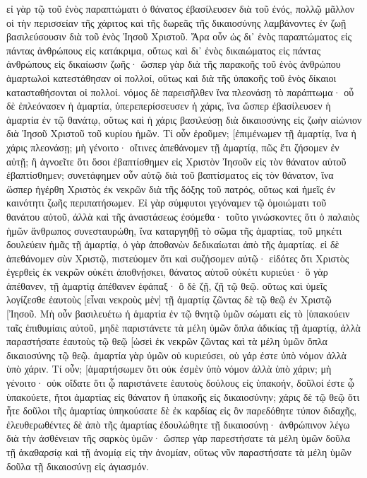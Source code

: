εἰ γὰρ τῷ τοῦ ἑνὸς παραπτώματι ὁ θάνατος ἐβασίλευσεν διὰ τοῦ ἑνός, πολλῷ μᾶλλον οἱ τὴν περισσείαν τῆς χάριτος καὶ τῆς δωρεᾶς τῆς δικαιοσύνης λαμβάνοντες ἐν ζωῇ βασιλεύσουσιν διὰ τοῦ ἑνὸς Ἰησοῦ Χριστοῦ. 
Ἄρα οὖν ὡς δι᾽ ἑνὸς παραπτώματος εἰς πάντας ἀνθρώπους εἰς κατάκριμα, οὕτως καὶ δι᾽ ἑνὸς δικαιώματος εἰς πάντας ἀνθρώπους εἰς δικαίωσιν ζωῆς· 
ὥσπερ γὰρ διὰ τῆς παρακοῆς τοῦ ἑνὸς ἀνθρώπου ἁμαρτωλοὶ κατεστάθησαν οἱ πολλοί, οὕτως καὶ διὰ τῆς ὑπακοῆς τοῦ ἑνὸς δίκαιοι κατασταθήσονται οἱ πολλοί. 
νόμος δὲ παρεισῆλθεν ἵνα πλεονάσῃ τὸ παράπτωμα· οὗ δὲ ἐπλεόνασεν ἡ ἁμαρτία, ὑπερεπερίσσευσεν ἡ χάρις, 
ἵνα ὥσπερ ἐβασίλευσεν ἡ ἁμαρτία ἐν τῷ θανάτῳ, οὕτως καὶ ἡ χάρις βασιλεύσῃ διὰ δικαιοσύνης εἰς ζωὴν αἰώνιον διὰ Ἰησοῦ Χριστοῦ τοῦ κυρίου ἡμῶν. 
Τί οὖν ἐροῦμεν; [ἐπιμένωμεν τῇ ἁμαρτίᾳ, ἵνα ἡ χάρις πλεονάσῃ; 
μὴ γένοιτο· οἵτινες ἀπεθάνομεν τῇ ἁμαρτίᾳ, πῶς ἔτι ζήσομεν ἐν αὐτῇ; 
ἢ ἀγνοεῖτε ὅτι ὅσοι ἐβαπτίσθημεν εἰς Χριστὸν Ἰησοῦν εἰς τὸν θάνατον αὐτοῦ ἐβαπτίσθημεν; 
συνετάφημεν οὖν αὐτῷ διὰ τοῦ βαπτίσματος εἰς τὸν θάνατον, ἵνα ὥσπερ ἠγέρθη Χριστὸς ἐκ νεκρῶν διὰ τῆς δόξης τοῦ πατρός, οὕτως καὶ ἡμεῖς ἐν καινότητι ζωῆς περιπατήσωμεν. 
Εἰ γὰρ σύμφυτοι γεγόναμεν τῷ ὁμοιώματι τοῦ θανάτου αὐτοῦ, ἀλλὰ καὶ τῆς ἀναστάσεως ἐσόμεθα· 
τοῦτο γινώσκοντες ὅτι ὁ παλαιὸς ἡμῶν ἄνθρωπος συνεσταυρώθη, ἵνα καταργηθῇ τὸ σῶμα τῆς ἁμαρτίας, τοῦ μηκέτι δουλεύειν ἡμᾶς τῇ ἁμαρτίᾳ, 
ὁ γὰρ ἀποθανὼν δεδικαίωται ἀπὸ τῆς ἁμαρτίας. 
εἰ δὲ ἀπεθάνομεν σὺν Χριστῷ, πιστεύομεν ὅτι καὶ συζήσομεν αὐτῷ· 
εἰδότες ὅτι Χριστὸς ἐγερθεὶς ἐκ νεκρῶν οὐκέτι ἀποθνῄσκει, θάνατος αὐτοῦ οὐκέτι κυριεύει· 
ὃ γὰρ ἀπέθανεν, τῇ ἁμαρτίᾳ ἀπέθανεν ἐφάπαξ· ὃ δὲ ζῇ, ζῇ τῷ θεῷ. 
οὕτως καὶ ὑμεῖς λογίζεσθε ἑαυτοὺς [εἶναι νεκροὺς μὲν] τῇ ἁμαρτίᾳ ζῶντας δὲ τῷ θεῷ ἐν Χριστῷ [Ἰησοῦ. 
Μὴ οὖν βασιλευέτω ἡ ἁμαρτία ἐν τῷ θνητῷ ὑμῶν σώματι εἰς τὸ [ὑπακούειν ταῖς ἐπιθυμίαις αὐτοῦ, 
μηδὲ παριστάνετε τὰ μέλη ὑμῶν ὅπλα ἀδικίας τῇ ἁμαρτίᾳ, ἀλλὰ παραστήσατε ἑαυτοὺς τῷ θεῷ [ὡσεὶ ἐκ νεκρῶν ζῶντας καὶ τὰ μέλη ὑμῶν ὅπλα δικαιοσύνης τῷ θεῷ. 
ἁμαρτία γὰρ ὑμῶν οὐ κυριεύσει, οὐ γάρ ἐστε ὑπὸ νόμον ἀλλὰ ὑπὸ χάριν. 
Τί οὖν; [ἁμαρτήσωμεν ὅτι οὐκ ἐσμὲν ὑπὸ νόμον ἀλλὰ ὑπὸ χάριν; μὴ γένοιτο· 
οὐκ οἴδατε ὅτι ᾧ παριστάνετε ἑαυτοὺς δούλους εἰς ὑπακοήν, δοῦλοί ἐστε ᾧ ὑπακούετε, ἤτοι ἁμαρτίας εἰς θάνατον ἢ ὑπακοῆς εἰς δικαιοσύνην; 
χάρις δὲ τῷ θεῷ ὅτι ἦτε δοῦλοι τῆς ἁμαρτίας ὑπηκούσατε δὲ ἐκ καρδίας εἰς ὃν παρεδόθητε τύπον διδαχῆς, 
ἐλευθερωθέντες δὲ ἀπὸ τῆς ἁμαρτίας ἐδουλώθητε τῇ δικαιοσύνῃ· 
ἀνθρώπινον λέγω διὰ τὴν ἀσθένειαν τῆς σαρκὸς ὑμῶν· ὥσπερ γὰρ παρεστήσατε τὰ μέλη ὑμῶν δοῦλα τῇ ἀκαθαρσίᾳ καὶ τῇ ἀνομίᾳ εἰς τὴν ἀνομίαν, οὕτως νῦν παραστήσατε τὰ μέλη ὑμῶν δοῦλα τῇ δικαιοσύνῃ εἰς ἁγιασμόν. 
